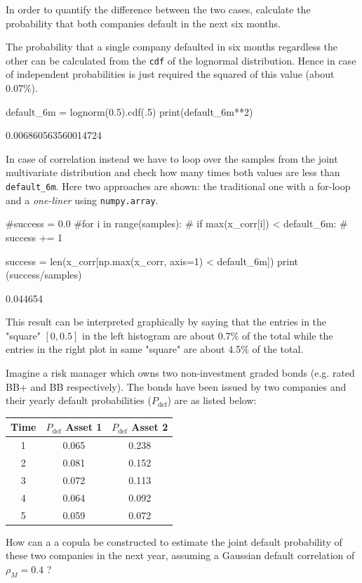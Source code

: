 \begin{solution}
In order to quantify the difference between the two cases, calculate the probability that both companies default in the next six months.

The probability that a single company defaulted in six months regardless the other can be calculated from the \texttt{cdf} of the lognormal distribution. Hence in case of independent probabilities is just required the squared of this value (about 0.07\%).

\begin{ipython}
default_6m = lognorm(0.5).cdf(.5)
print(default_6m**2)
\end{ipython}
\begin{ioutput}
0.006860563560014724
\end{ioutput}

In case of correlation instead we have to loop over the samples from the joint multivariate distribution and check how many times both values are less than \texttt{default\_6m}. Here two approaches are shown: the traditional one with a for-loop and a \emph{one-liner} using \texttt{numpy.array}.

\begin{ipython}
#success = 0.0
#for i in range(samples):
#    if max(x_corr[i]) < default_6m:
#        success += 1

success = len(x_corr[np.max(x_corr, axis=1) < default_6m])
print (success/samples)
\end{ipython}
\begin{ioutput}
0.044654
\end{ioutput}

This result can be interpreted graphically by saying that the entries in the "square" $[0, 0.5]$ in the left histogram are about 0.7\% of the total while the entries in the right plot in same "square" are about 4.5\% of the total. 
\end{solution}

\begin{question}
Imagine a risk manager which owns two non-investment graded bonds (e.g. rated BB+ and BB respectively). The bonds have been issued by two companies and their yearly default probabilities ($P_{\mathrm{def}}$) are as listed below:

\begin{table}[htbp]
\centering
\begin{tabular}{|c|c|c|}
\hline
Time & $P_{\mathrm{def}}$ Asset 1 & $P_{\mathrm{def}}$ Asset 2 \\
\hline
\hline
1 & 0.065 & 0.238 \\
2 & 0.081 & 0.152 \\
3 & 0.072 & 0.113 \\
4 & 0.064 & 0.092 \\
5 & 0.059 & 0.072 \\
\hline
\end{tabular}
\end{table}

How can a a copula be constructed to estimate the joint default probability of these two companies in the next year, assuming a Gaussian default correlation of $\rho_M = 0.4$ ?
\end{question}

